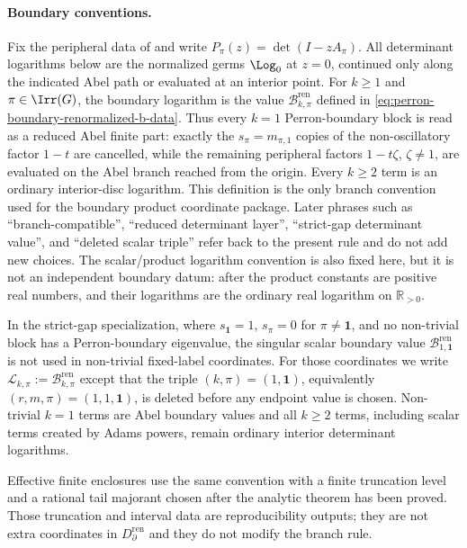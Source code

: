 \paragraph{Boundary conventions.}
\begin{definition}
  \label{def:perron-boundary-logarithm-convention}
  Fix the peripheral data of
   and write
  \(P_\pi(z)=\det(I-zA_\pi)\).  All determinant logarithms below are the
  normalized germs \(\Log_0\) at \(z=0\), continued only along the indicated
  Abel path or evaluated at an interior point.  For \(k\ge1\) and
  \(\pi\in\Irr(G)\), the boundary logarithm is the value
  \(\mathcal B_{k,\pi}^{\mathrm{ren}}\) defined in
  \eqref{eq:perron-boundary-renormalized-b-data}.
  Thus every \(k=1\) Perron-boundary block is read as a reduced Abel finite
  part: exactly the \(s_\pi=m_{\pi,1}\) copies of the non-oscillatory factor
  \(1-t\) are cancelled, while the remaining peripheral factors
  \(1-t\zeta\), \(\zeta\ne1\), are evaluated on the Abel branch reached from
  the origin.  Every \(k\ge2\) term is an ordinary interior-disc logarithm.
  This definition is the only branch convention used for the boundary product
  coordinate package.  Later phrases such as ``branch-compatible'',
  ``reduced determinant layer'', ``strict-gap determinant value'', and
  ``deleted scalar triple'' refer back to the present rule and do not add new
  choices.  The scalar/product logarithm convention is also fixed here, but it
  is not an independent boundary datum: after
   the product constants are
  positive real numbers, and their logarithms are the ordinary real logarithm
  on \(\mathbb R_{>0}\).

  In the strict-gap specialization, where
  \(s_{\mathbf1}=1\), \(s_\pi=0\) for \(\pi\ne\mathbf1\), and no non-trivial
  block has a Perron-boundary eigenvalue, the singular scalar boundary value
  \(\mathcal B_{1,\mathbf1}^{\mathrm{ren}}\) is not used in non-trivial
  fixed-label coordinates.  For those coordinates we write
  \(\mathcal L_{k,\pi}:=\mathcal B_{k,\pi}^{\mathrm{ren}}\) except that the
  triple \((k,\pi)=(1,\mathbf1)\), equivalently
  \((r,m,\pi)=(1,1,\mathbf1)\), is deleted before any endpoint value is
  chosen.  Non-trivial \(k=1\) terms are Abel boundary values and all
  \(k\ge2\) terms, including scalar terms created by Adams powers, remain
  ordinary interior determinant logarithms.

  Effective finite enclosures use the same convention with a finite
  truncation level and a rational tail majorant chosen after the analytic
  theorem has been proved.  Those truncation and interval data are
  reproducibility outputs; they are not extra coordinates in
  \(D_{\partial}^{\mathrm{ren}}\) and they do not modify the branch rule.
\end{definition}

